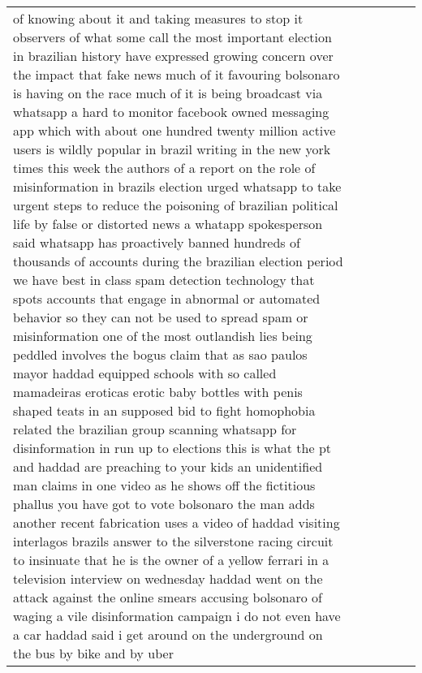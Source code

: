 \documentclass[]{article}
\begin{document}
\begin{table}[!h]
\begin{tabular}[t]{llllll}
of knowing about it and taking measures to stop it observers of what some call the most important election in brazilian history have expressed growing concern over the impact that fake news much of it favouring bolsonaro is having on the race much of it is being broadcast via whatsapp a hard to monitor facebook owned messaging app which with about one hundred twenty million active users is wildly popular in brazil writing in the new york times this week the authors of a report on the role of misinformation in brazils election urged whatsapp to take urgent steps to reduce the poisoning of brazilian political life by false or distorted news a whatapp spokesperson said whatsapp has proactively banned hundreds of thousands of accounts during the brazilian election period we have best in class spam detection technology that spots accounts that engage in abnormal or automated behavior so they can not be used to spread spam or misinformation one of the most outlandish lies being peddled involves the bogus claim that as sao paulos mayor haddad equipped schools with so called mamadeiras eroticas erotic baby bottles with penis shaped teats in an supposed bid to fight homophobia related the brazilian group scanning whatsapp for disinformation in run up to elections this is what the pt and haddad are preaching to your kids an unidentified man claims in one video as he shows off the fictitious phallus you have got to vote bolsonaro the man adds another recent fabrication uses a video of haddad visiting interlagos brazils answer to the silverstone racing circuit to insinuate that he is the owner of a yellow ferrari in a television interview on wednesday haddad went on the attack against the online smears accusing bolsonaro of waging a vile disinformation campaign i do not even have a car haddad said i get around on the underground on the bus by bike and by uber\\

\end{tabular}
\end{table}
\end{document}
